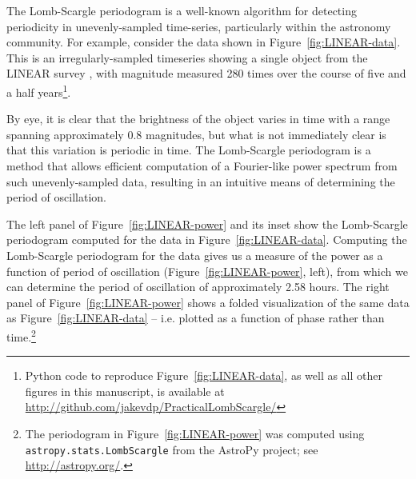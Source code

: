 \documentclass[preprint]{aastex}
\newcommand{\fig}[1]{Figure~\ref{fig:#1}}
\begin{document}
The Lomb-Scargle periodogram \citep{Lomb76, Scargle82}
is a well-known algorithm for detecting periodicity
in unevenly-sampled time-series, particularly within the astronomy community.
For example, consider the data shown in \fig{LINEAR-data}.
This is an irregularly-sampled timeseries showing a single object from the
LINEAR survey \citep{LINEAR1, LINEAR3}, with magnitude measured 280 times over
the course of five and a half years\footnote{
  Python code to reproduce \fig{LINEAR-data}, as well as all other figures
  in this manuscript, is available at 
  \url{http://github.com/jakevdp/PracticalLombScargle/}}.

By eye, it is clear that the brightness of the object varies in time with a range spanning approximately 0.8 magnitudes, but what is not immediately clear is that this variation is periodic in time.
The Lomb-Scargle periodogram is a method that allows efficient computation of a Fourier-like power spectrum from such unevenly-sampled data, resulting in an intuitive means of determining the period of oscillation.

The left panel of \fig{LINEAR-power} and its inset show the Lomb-Scargle periodogram computed for the data in \fig{LINEAR-data}.
Computing the Lomb-Scargle periodogram for the data gives us a measure of the
power as a function of period of oscillation (\fig{LINEAR-power}, left), from
which we can determine the period of oscillation of approximately 2.58 hours.
The right panel of \fig{LINEAR-power} shows a folded visualization of
the same data as \fig{LINEAR-data} -- i.e.{} plotted as a function of phase
rather than time.\footnote{
    The periodogram in \fig{LINEAR-power} was computed using
    {\tt astropy.stats.LombScargle}
    from the AstroPy project; see \url{http://astropy.org/}.
}
\end{document}
